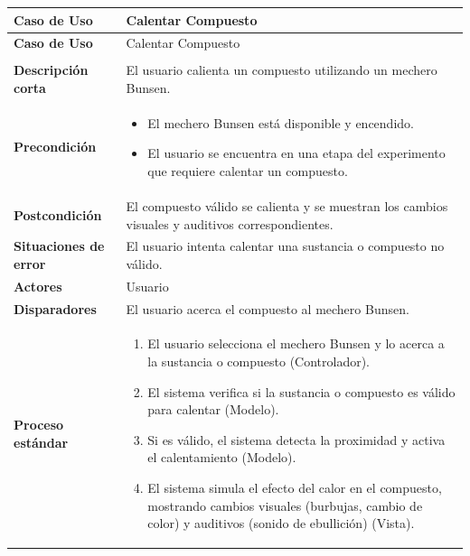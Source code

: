 \begin{longtable}{>{\raggedright\arraybackslash}m{} >{\raggedright\arraybackslash}m{}}
    \toprule\toprule
    \textbf{Caso de Uso} &   Calentar Compuesto \\
    \midrule\midrule
    \endfirsthead

    \toprule\toprule
    \textbf{Caso de Uso} &   Calentar Compuesto \\
    \midrule\midrule
    \endhead

    \midrule
    \multicolumn{2}{r}{\textit{Continúa en la siguiente página}} \\
    \midrule
    \endfoot

    \endlastfoot

    \textbf{Descripción corta} &  El usuario calienta un compuesto utilizando un mechero Bunsen. \\
    \midrule
    \textbf{Precondición} & 
    \begin{itemize}
        \item El mechero Bunsen está disponible y encendido. 
        \item El usuario se encuentra en una etapa del experimento que requiere calentar un compuesto. 
    \end{itemize}\\
    \midrule
    \textbf{Postcondición} &  El compuesto válido se calienta y se muestran los cambios visuales y auditivos correspondientes.\\
    \midrule
    \textbf{Situaciones de error} & El usuario intenta calentar una sustancia o compuesto no válido.\\
    \midrule
    \textbf{Actores} & Usuario \\
    \midrule
    \textbf{Disparadores} & El usuario acerca el compuesto al mechero Bunsen.\\
    \midrule
    \textbf{Proceso estándar} &
    \begin{enumerate}
        \item El usuario selecciona el mechero Bunsen y lo acerca a la sustancia o compuesto (Controlador). 
        \item El sistema verifica si la sustancia o compuesto es válido para calentar (Modelo). 
        \item Si es válido, el sistema detecta la proximidad y activa el calentamiento (Modelo). 
        \item El sistema simula el efecto del calor en el compuesto, mostrando cambios visuales (burbujas, cambio de color) y auditivos (sonido de ebullición) (Vista). 

\end{enumerate}
\end{longtable}
